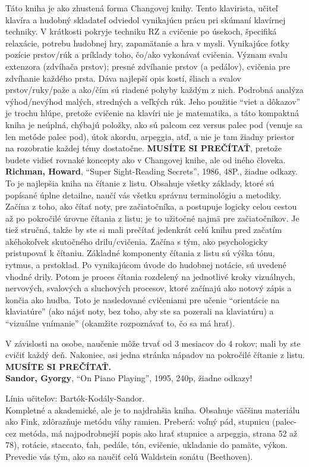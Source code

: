 \documentclass[11pt,a4paper]{book}
\begin{document}
Táto kniha je ako zhustená forma Changovej knihy. Tento klavirista, učiteľ klavíra a hudobný skladateľ odviedol vynikajúcu prácu pri skúmaní klavírnej techniky. V krátkosti pokryje techniku RZ a cvičenie po úsekoch, špecifiká relaxácie, potrebu hudobnej hry, zapamätanie a hra v mysli. Vynikajúce fotky pozície prstov/rúk a príklady toho, čo/ako vykonávať cvičenia. Význam svalu extenzora (zdvíhača prstov); presné zdvíhanie prstov (a pedálov), cvičenia pre zdvíhanie každého prsta. Dáva najlepší opis kostí, šliach a svalov prstov/ruky/paže a ako/čím   sú riadené pohyby každým z nich. Podrobná analýza výhod/nevýhod malých, stredných a veľkých rúk. Jeho použitie “viet a dôkazov” je trochu hlúpe, pretože cvičenie na klavíri nie je matematika, a táto kompaktná kniha je neúplná, chýbajú položky, ako sú palcom cez versus palec pod (venuje sa len metóde palec pod), útok akordu, arpeggia, atď, a nie je tam žiadny priestor na rozobratie každej témy dostatočne. \textbf{MUSÍTE SI PREČÍTAŤ}, pretože budete vidieť rovnaké koncepty ako v Changovej knihe, ale od iného človeka.
\medskip\\
\textbf{Richman, Howard}, “Super Sight-Reading Secrets”, 1986, 48P., žiadne odkazy. To je najlepšia kniha na čítanie z listu. Obsahuje všetky základy, ktoré sú popísané úplne detailne, naučí vás všetku správnu terminológiu a metodiky. Začína z toho, ako čítať noty, pre začiatočníka, a postupuje logicky celou cestou až po pokročilé úrovne čítania z listu; je to užitočné najmä pre začiatočníkov. Je tiež stručná, takže by ste si mali prečítať jedenkrát celú knihu pred začatím akéhokoľvek skutočného drilu/cvičenia. Začína s tým, ako psychologicky pristupovať k čítaniu. Základné komponenty čítania z listu sú výška tónu, rytmus, a prstoklad. Po vynikajúcom úvode do hudobnej notácie, sú uvedené vhodné drily. Potom je proces čítania rozdelený na jednotlivé kroky vizuálnych, nervových, svalových a sluchových procesov, ktoré začínajú ako notový zápis a končia ako hudba. Toto je nasledované cvičeniami pre učenie “orientácie na klaviatúre” (ako nájsť noty, bez toho, aby ste sa pozerali na klaviatúru) a “vizuálne vnímanie” (okamžite rozpoznávať to, čo sa má hrať). 

V závislosti na osobe, naučenie môže trvať od 3 mesiacov do 4 rokov; mali by ste cvičiť každý deň. Nakoniec, asi jedna stránka nápadov na pokročilé čítanie z listu. \textbf{MUSÍTE SI PREČÍTAŤ.}
\medskip\\
\textbf{Sandor, Gyorgy}, “On Piano Playing”, 1995, 240p, žiadne odkazy!

Línia učiteľov: Bartók-Kodály-Sandor.\\
Kompletné a akademické, ale je to najdrahšia kniha. Obsahuje väčšinu materiálu ako Fink, zdôrazňuje metódu váhy ramien. Preberá: voľný pád, stupnicu (palec-cez metóda, má najpodrobnejší popis ako hrať stupnice a arpeggia, strana 52 až 78), rotácie, staccato, ťah, pedále, tón, cvičenie, ukladanie do pamäte, výkon. Prevedie vás tým, ako sa naučiť celú Waldstein sonátu (Beethoven). 
\end{document}
